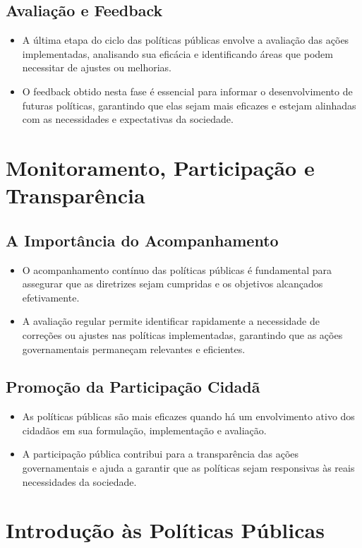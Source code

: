 \documentclass[
   article,       
   12pt,          
   oneside,       
   a4paper,       
   english,       
   brazil,        
   sumario=tradicional
   ]{abntex2}
\begin{document}
\subsection{Avaliação e Feedback}
\begin{itemize}
    \item A última etapa do ciclo das políticas públicas envolve a avaliação das ações implementadas, analisando sua eficácia e identificando áreas que podem necessitar de ajustes ou melhorias.
    \item O feedback obtido nesta fase é essencial para informar o desenvolvimento de futuras políticas, garantindo que elas sejam mais eficazes e estejam alinhadas com as necessidades e expectativas da sociedade.
\end{itemize}

\section{Monitoramento, Participação e Transparência}
\subsection{A Importância do Acompanhamento}
\begin{itemize}
    \item O acompanhamento contínuo das políticas públicas é fundamental para assegurar que as diretrizes sejam cumpridas e os objetivos alcançados efetivamente.
    \item A avaliação regular permite identificar rapidamente a necessidade de correções ou ajustes nas políticas implementadas, garantindo que as ações governamentais permaneçam relevantes e eficientes.
\end{itemize}

\subsection{Promoção da Participação Cidadã}
\begin{itemize}
    \item As políticas públicas são mais eficazes quando há um envolvimento ativo dos cidadãos em sua formulação, implementação e avaliação.
    \item A participação pública contribui para a transparência das ações governamentais e ajuda a garantir que as políticas sejam responsivas às reais necessidades da sociedade.
\end{itemize}
\section{Introdução às Políticas Públicas}
\end{document}

